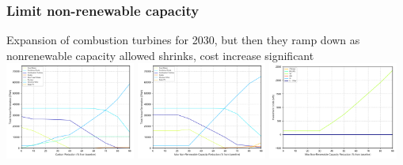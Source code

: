 \documentclass[xcolor=dvipsnames]{beamer}
\begin{document}
%
%


\begin{frame}
  \frametitle{Limit non-renewable capacity}
  Expansion of combustion turbines for 2030, but then they ramp down
  as nonrenewable capacity allowed shrinks, cost increase significant\\
  \includegraphics[width=0.32\textwidth]{includes/no_leakage_shutdowns_agg_generation_cntlreg.png}
  \includegraphics[width=0.32\textwidth]{includes/no_leakage_maxNR_agg_generation_cntlreg.png}
  \includegraphics[width=0.32\textwidth]{includes/no_leakage_maxNR_invest_costs_by_region.png}


\end{frame}
\end{document}
